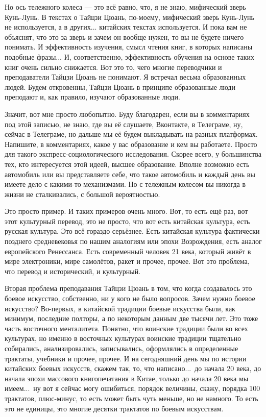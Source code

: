 Но ось тележного колеса --- это всё 
равно,  что, я не знаю,  мифический зверь Кунь-Лунь.  В 
текстах о Тайцзи Цюань, по-моему, мифический зверь 
Кунь-Лунь не используется, а в других... китайских 
текстах используется. И пока вам не объяснят, что это 
за зверь и зачем он вообще нужен,  то вы не будете 
ничего понимать. И эффективность изучения,  смысл
чтения книг, в которых написаны подобные фразы...  И, 
соответственно, эффективность обучения на основе 
таких книг очень сильно снижается.  Вот это то, чего 
многие переводчики и преподаватели Тайцзи Цюань не 
понимают. Я встречал весьма образованных людей.  Будем 
откровенны, Тайцзи Цюань в принципе образованные люди 
преподают и, как правило, изучают образованные люди. 

Значит,  вот мне просто любопытно. Буду благодарен, 
если вы в комментариях  под этой записью, не знаю, где 
вы её слушаете, Вконтакте, в Телеграме, ну, сейчас в 
Телеграме, но дальше мы её будем выкладывать на разных 
платформах. Напишите,  в комментариях,  какое у вас 
образование и кем вы работаете. Просто для такого 
экспресс-социологического исследования. Скорее 
всего,  у большинства тех, кто интересуется этой идеей, 
высшее образование.  Вполне возможно есть 
автомобиль или вы представляете себе, что такое 
автомобиль и каждый день вы имеете дело с какими-то 
механизмами. Но с тележным колесом вы никогда в жизни 
не сталкивались, с большой вероятностью.

Это просто 
пример.  И таких примеров очень много.  Вот, то есть ещё
раз, вот этот культурный перевод, это не просто, что 
вот есть китайская культура, есть русская культура.  
Это всё гораздо серьёзнее. Есть китайская культура 
фактически позднего средневековья по нашим аналогиям 
или эпохи Возрождения,  есть аналог европейского 
Ренессанса. Есть современный человек 21 века, который 
живёт в мире электроники, мире самолётов, ракет и 
прочее, прочее. Вот это проблема, что перевод и 
исторический,  и культурный.

Вторая проблема 
преподавания Тайцзи Цюань в том,  что когда создавалось 
это боевое искусство, собственно, ни у кого не было 
вопросов. Зачем нужно боевое искусство?  Во-первых,  
в китайской традиции боевые искусства были, как 
минимум,  последние полторы, а по некоторым данным две 
тысячи лет. Это тоже часть восточного менталитета.  
Понятно, что воинские традиции были во всех культурах, 
но именно в восточных культурах воинские традиции 
тщательно собирались, анализировались,  записывались, 
 оформлялись в определенные трактаты, учебники и 
прочее, прочее.  И на сегодняшний день мы по истории 
китайских боевых искусств, скажем так, то, что 
написано...\ до начала 20 века, до начала эпохи массового 
книгопечатания в Китае, только до начала 20 века мы 
имеем...\ ну вот я сейчас могу ошибиться,  порядок 
величины, скажу, порядка 100 трактатов,  плюс-минус, то 
есть может быть чуть меньше, но не намного. То есть это 
не единицы,  это многие десятки трактатов по боевым
искусствам.

